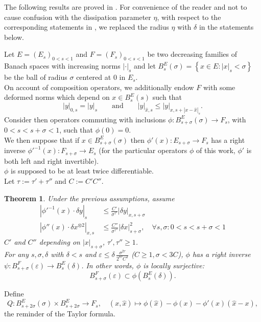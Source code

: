 \documentclass[oneside, 11pt]{amsbook}
\newcommand{\set}[1]{{\left\{#1\right\}}}
\newcommand{\abs}[1]{{\left|#1\right|}}
\newcommand{\eps}{\varepsilon}
\newcommand{\tensor}{\otimes}%
\newcommand{\inderiv}[1]{#1'^{-1}}
\newcommand{\0}{{(0)}}
\newcommand{\3}{{(3)}}
\newtheorem{thm}{Theorem}[section]
\numberwithin{equation}{section}
\numberwithin{defn}{section}
\numberwithin{prop}{section}
\numberwithin{cor}{section}
\numberwithin{lemma}{section}
\numberwithin{rmk}{section}
\numberwithin{corollary}{section}
\begin{document}
The following results are proved in \cite{Massetti:ETDS}. For convenience of the reader and not to cause confusion with the dissipation parameter $\eta$, with respect to the corresponding statements in \cite{Massetti:ETDS}, we replaced the radius $\eta$ with $\delta$ in the statements below. 

Let $E=(E_s)_{0<s<1}$ and $F=(F_s)_{0<s<1}$ be two decreasing families of Banach spaces with increasing norms $\abs{\cdot}_s$ and let $B^E_s(\sigma)=\set{x\in E : \abs{x}_s<\sigma}$ be the ball of radius $\sigma$ centered at $0$ in $E_s$. \\ On account of composition operators, we additionally endow $F$ with some deformed norms which depend on $x\in B^E_s(s)$ such that \[ \abs{y}_{0,s} = \abs{y}_s \qquad \text{and}\qquad \abs{y}_{\hat{x},s}\leq \abs{y}_{x, s + \abs{x - \hat{x}}_s}.\]
Consider then operators commuting with inclusions $\phi: B^E_{s+\sigma}(\sigma) \to F_s$, with $0<s<s+\sigma<1$, such that $\phi(0) = 0$. \\We then suppose that if $x\in B^E_{s+\sigma}(\sigma)$ then $\phi'(x):E_{s+\sigma}\to F_s$ has a right inverse $\phi'^{-1}(x): F_{s+\sigma}\to E_s$ (for the particular operators $\phi$ of this work, $\phi'$ is both left and right invertible).\\ $\phi$ is supposed to be at least twice differentiable.\\
Let $\tau:=\tau'+\tau''$ and $C:=C'C''$.
\begin{thm}\label{teo inversa}
Under the previous assumptions, assume
\begin{align}
\label{bound phi'^-1}
\abs{\inderiv{\phi}(x)\cdot\delta y}_s\, &\leq \frac{C'}{\sigma^{\tau'}}\abs{\delta y}_{x,s+\sigma}\\
\label{bound phi''}
\abs{\phi''(x)\cdot \delta x^{\tensor 2}}_{x,s}\, &\leq \frac{C''}{\sigma^{\tau''}}\abs{\delta x}^2_{s+\sigma},\quad \forall s,\sigma: 0<s<s+\sigma<1
\end{align}
$C'$ and $C''$ depending on $\abs{x}_{s+\sigma}$, $\tau',\tau''\geq 1$. \\
For any $s, \sigma, \delta$ with $\delta<s$ and $\eps\leq \delta \, \frac{\sigma^{2\tau}}{2^{8\tau}C^2}$ ($ C\geq 1,\sigma< 3 C$), $\phi$ has a right inverse $\psi: B^F_{s+\sigma}(\eps)\to B^E_{s}(\delta)$. In other words, $\phi$ is locally surjective: $$ B^{F}_{s+\sigma}(\eps)\subset \phi(B^{E}_{s}(\delta)).$$ 
\end{thm}
Define
\begin{equation}
Q : B^E_{s+2\sigma}(\sigma) \times B^E_{s+2\sigma}\to F_s,\quad (x,\hat{x})\mapsto \phi(\hat{x}) - \phi(x) - \phi'(x)(\hat{x} - x),
\label{resto Taylor}
\end{equation}  
 the reminder of the Taylor formula.\\
\end{document}
